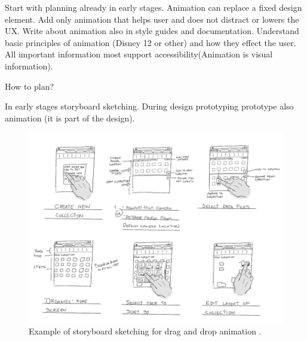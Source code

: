 Start with planning already in early stages.
Animation can replace a fixed design element.
Add only animation that helps user and does not distract or lowers the UX.
Write about animation also in style guides and documentation.
Understand basic principles of animation (Disney 12 or other) and how they effect the user.
All important information most support accessibility(Animation is visual information).

How to plan?

In early stages storyboard sketching.
During design prototyping prototype also animation (it is part of the design).

\begin{figure}[tp]
\centering
\includegraphics[keepaspectratio,width=\hsize,height=\halfh]
{images/storyboard.jpeg}

\caption[Storyboard Sketching]{
Example of storyboard sketching for drag and drop animation \citep{microsoftStoryboard}.
}
\label{fig:storyboard}
\end{figure}
